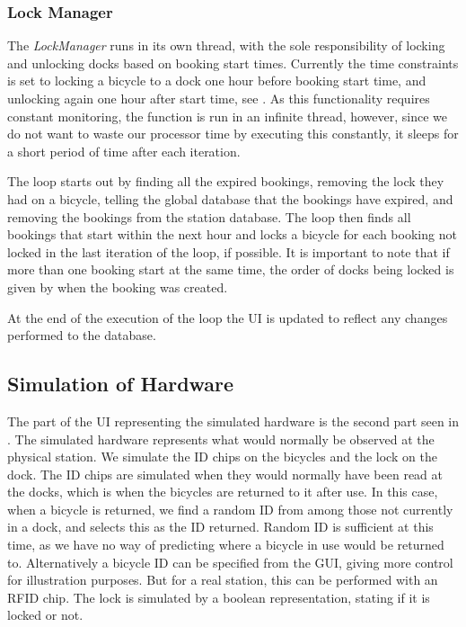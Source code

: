 \subsubsection{Lock Manager}
The \textit{LockManager} runs in its own thread, with the sole responsibility of locking and unlocking docks based on booking start times. 
Currently the time constraints is set to locking a bicycle to a dock one hour before booking start time, and unlocking again one hour after start time, see . 
As this functionality requires constant monitoring, the function is run in an infinite thread, however, since we do not want to waste our processor time by executing this constantly, it sleeps for a short period of time after each iteration.

The loop starts out by finding all the expired bookings, removing the lock they had on a bicycle, telling the global database that the bookings have expired, and removing the bookings from the station database.
The loop then finds all bookings that start within the next hour and locks a bicycle for each booking not locked in the last iteration of the loop, if possible. 
It is important to note that if more than one booking start at the same time, the order of docks being locked is given by when the booking was created. 

At the end of the execution of the loop the UI is updated to reflect any changes performed to the database.

\subsection{Simulation of Hardware}
The part of the UI representing the simulated hardware is the second part seen in .
The simulated hardware represents what would normally be observed at the physical station.
We simulate the ID chips on the bicycles and the lock on the dock.
The ID chips are simulated when they would normally have been read at the docks, which is when the bicycles are returned to it after use.
In this case, when a bicycle is returned, we find a random ID from among those not currently in a dock, and selects this as the ID returned.
Random ID is sufficient at this time, as we have no way of predicting where a bicycle in use would be returned to.
Alternatively a bicycle ID can be specified from the GUI, giving more control for illustration purposes.
But for a real station, this can be performed with an RFID chip.
The lock is simulated by a boolean representation, stating if it is locked or not.

